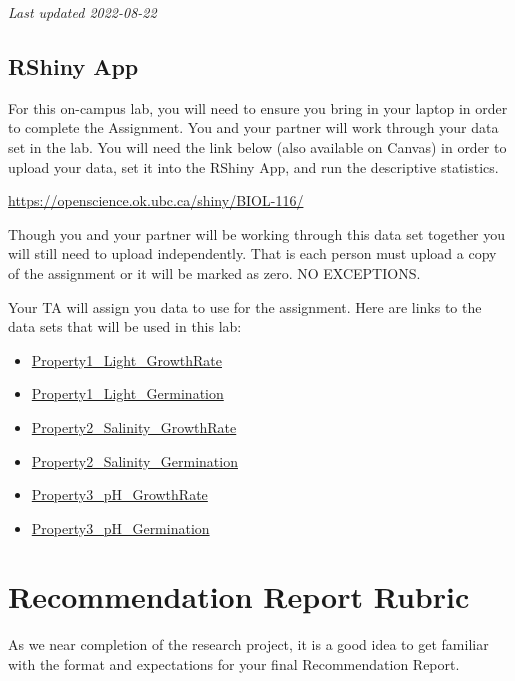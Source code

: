 \documentclass[
]{book}
\providecommand{\tightlist}{%
  \setlength{\itemsep}{0pt}\setlength{\parskip}{0pt}}
\begin{document}
\emph{Last updated 2022-08-22}

\hypertarget{rshiny-app}{%
\subsection*{RShiny App}\label{rshiny-app}}

For this on-campus lab, you will need to ensure you bring in your laptop in order to complete the Assignment. You and your partner will work through your data set in the lab. You will need the link below (also available on Canvas) in order to upload your data, set it into the RShiny App, and run the descriptive statistics.

\url{https://openscience.ok.ubc.ca/shiny/BIOL-116/}

Though you and your partner will be working through this data set together you will still need to upload independently. That is each person must upload a copy of the assignment or it will be marked as zero. NO EXCEPTIONS.

Your TA will assign you data to use for the assignment. Here are links to the data sets that will be used in this lab:

\begin{itemize}
\tightlist
\item
  \href{files/Property1_Light_GrowthRate.csv}{Property1\_Light\_GrowthRate}
\item
  \href{files/Property1_Light_Germination.csv}{Property1\_Light\_Germination}
\item
  \href{files/Property2_Salinity_GrowthRate.csv}{Property2\_Salinity\_GrowthRate}
\item
  \href{files/Property2_Salinity_Germination.csv}{Property2\_Salinity\_Germination}
\item
  \href{files/Property3_pH_GrowthRate.csv}{Property3\_pH\_GrowthRate}
\item
  \href{files/Property3_pH_Germination.csv}{Property3\_pH\_Germination}
\end{itemize}

\hypertarget{recommendation-report-rubric}{%
\section*{Recommendation Report Rubric}\label{recommendation-report-rubric}}

As we near completion of the research project, it is a good idea to get familiar with the format and expectations for your final Recommendation Report.
\end{document}
